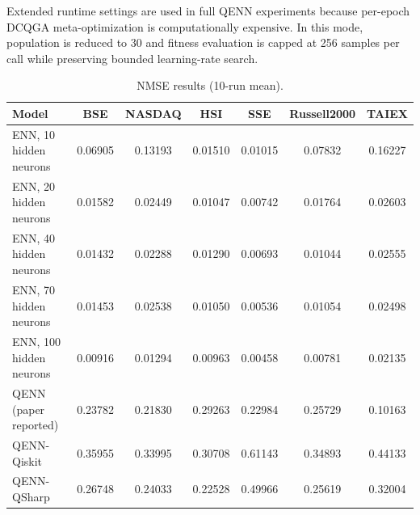\documentclass[conference]{IEEEtran}
\begin{document}
Extended runtime settings are used in full QENN experiments because per-epoch DCQGA meta-optimization is computationally expensive. In this mode, population is reduced to 30 and fitness evaluation is capped at 256 samples per call while preserving bounded learning-rate search.

\begin{table}[t]
\centering
\caption{NMSE results (10-run mean).}
\label{tab3}
\begin{tabular}{lcccccc}
\toprule
Model & BSE & NASDAQ & HSI & SSE & Russell2000 & TAIEX \\
\midrule
ENN, 10 hidden neurons & 0.06905 & 0.13193 & 0.01510 & 0.01015 & 0.07832 & 0.16227 \\
ENN, 20 hidden neurons & 0.01582 & 0.02449 & 0.01047 & 0.00742 & 0.01764 & 0.02603 \\
ENN, 40 hidden neurons & 0.01432 & 0.02288 & 0.01290 & 0.00693 & 0.01044 & 0.02555 \\
ENN, 70 hidden neurons & 0.01453 & 0.02538 & 0.01050 & 0.00536 & 0.01054 & 0.02498 \\
ENN, 100 hidden neurons & 0.00916 & 0.01294 & 0.00963 & 0.00458 & 0.00781 & 0.02135 \\
QENN (paper reported) & 0.23782 & 0.21830 & 0.29263 & 0.22984 & 0.25729 & 0.10163 \\
QENN-Qiskit & 0.35955 & 0.33995 & 0.30708 & 0.61143 & 0.34893 & 0.44133 \\
QENN-QSharp & 0.26748 & 0.24033 & 0.22528 & 0.49966 & 0.25619 & 0.32004 \\
\bottomrule
\end{tabular}
\end{table}
\end{document}
